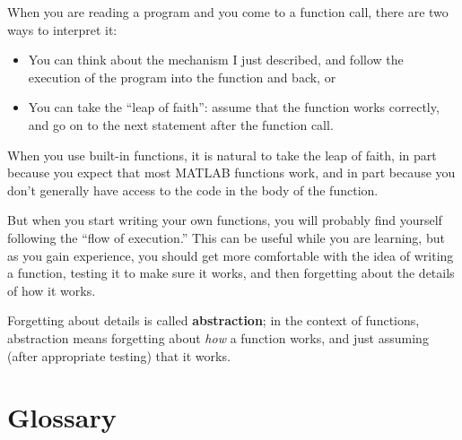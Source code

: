 \documentclass[
]{book}
\numberwithin{Answer}{chapter}
\numberwithin{Exercise}{chapter}
\begin{document}
When you are reading a program and you come to a function call,
there are two ways to interpret it:

\begin{itemize}

\item You can think about the mechanism I just described,
and follow the execution of the program into the function and back, or

\item You can take the ``leap of faith'': assume that the function
works correctly, and go on to the next statement after the function call.

\end{itemize}

When you use built-in functions, it is natural to take the leap
of faith, in part because you expect that most
MATLAB functions work, and in part because you don't
generally have access to the code in the body of the function.

But when you start writing your own functions, you will probably
find yourself following the ``flow of execution.''  This can
be useful while you are learning, but as you gain experience, you
should get more comfortable with the idea of writing a function,
testing it to make sure it works, and then forgetting about the
details of how it works.

Forgetting about details is called {\bf abstraction}; in the context
of functions, abstraction means forgetting about {\em how} a function
works, and just assuming (after appropriate testing) that it works.


\section{Glossary}
\end{document}
